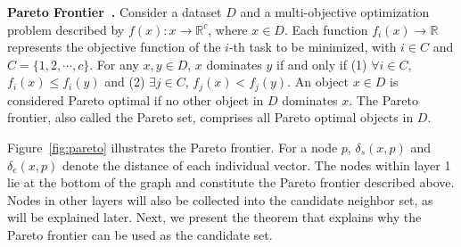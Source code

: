 \noindent\textbf{Pareto Frontier~\cite{ma2020efficient}.} Consider a dataset $D$ and a multi-objective optimization problem described by $f(x)\colon x \rightarrow \mathbb{R}^c$, where $x \in D$. Each function $f_i(x) \rightarrow \mathbb{R}$ represents the objective function of the $i$-th task to be minimized, with $i\in C$ and $C = \{1, 2, \cdots, c\}$. For any $x, y \in D$, $x$ dominates $y$ if and only if (1) $\forall i \in C$, $f_i(x) \leq f_i(y)$ and (2) $\exists j \in C$, $f_j(x) < f_j(y)$. An object $x \in D$ is considered Pareto optimal if no other object in $D$ dominates $x$. The Pareto frontier, also called the Pareto set, comprises all Pareto optimal objects in $D$.

Figure~\ref{fig:pareto} illustrates the Pareto frontier. For a node $p$, $\delta_s(x, p)$ and $\delta_e(x, p)$ denote the distance of each individual vector. 
The nodes within layer 1 lie at the bottom of the graph and constitute the Pareto frontier described above. Nodes in other layers will also be collected into the candidate neighbor set, as will be explained later. %
Next, we present the theorem that explains why the Pareto frontier can be used as the candidate set.

